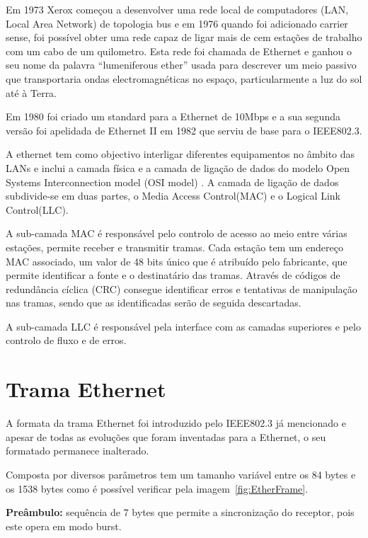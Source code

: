 \documentclass[a4paper]{IEEEtran}
\begin{document}
Em 1973 Xerox começou a desenvolver uma rede local de computadores (LAN, Local Area Network) de topologia bus e em 1976 quando foi adicionado carrier sense, foi possível obter uma rede capaz de ligar mais de cem estações de trabalho com um cabo de um quilometro. Esta rede foi chamada de Ethernet e ganhou o seu nome da palavra “lumeniferous ether”\cite{ether} usada para descrever um meio passivo que transportaria ondas electromagnéticas no espaço, particularmente a luz do sol até à Terra.

Em 1980 foi criado um standard para a Ethernet de 10Mbps e a sua segunda versão foi apelidada de Ethernet II em 1982 que serviu de base para o IEEE802.3.

A ethernet  tem como objectivo interligar diferentes equipamentos no âmbito das LANs e
inclui a camada física e a camada de ligação de dados do modelo Open Systems Interconnection model (OSI model) . A camada de ligação de dados subdivide-se em duas partes, o Media Access Control(MAC) e o Logical Link Control(LLC).

A sub-camada MAC é responsável pelo controlo de acesso ao meio entre várias estações, permite receber e transmitir tramas. Cada estação tem um endereço MAC associado, um valor de 48 bits único que é atribuído pelo fabricante, que permite identificar a fonte e o destinatário das tramas. Através de códigos de redundância cíclica (CRC) consegue identificar erros e tentativas de manipulação nas tramas, sendo que as identificadas serão de seguida descartadas.

A sub-camada LLC  é responsável pela interface com as camadas superiores e pelo controlo de fluxo e de erros.


\section{Trama Ethernet}
\label{sec:Trama Ethernet}

A formata da trama Ethernet foi introduzido pelo IEEE802.3 já mencionado e apesar de todas as evoluções que foram inventadas para a Ethernet, o seu formatado permanece inalterado.

Composta por diversos parâmetros tem um tamanho variável entre os 84 bytes e os 1538 bytes como é possível verificar pela imagem~\ref{fig:EtherFrame}.



\textbf{Preâmbulo:} sequência de 7 bytes que permite a sincronização do receptor, pois este opera em modo burst.
\end{document}
